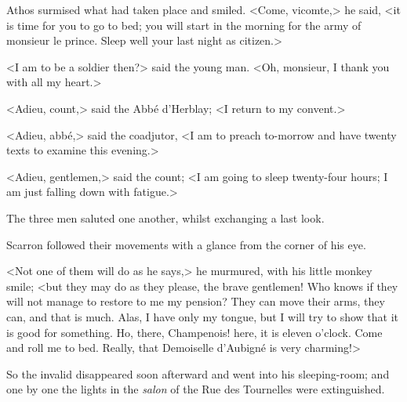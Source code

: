 Athos surmised what had taken place and smiled. <Come, vicomte,> he said, <it is time for you to go to bed; you will start in the morning for the army of monsieur le prince. Sleep well your last night as citizen.>

<I am to be a soldier then?> said the young man. <Oh, monsieur, I thank you with all my heart.>

<Adieu, count,> said the Abbé d'Herblay; <I return to my convent.>

<Adieu, abbé,> said the coadjutor, <I am to preach to-morrow and have twenty texts to examine this evening.>

<Adieu, gentlemen,> said the count; <I am going to sleep twenty-four hours; I am just falling down with fatigue.>

The three men saluted one another, whilst exchanging a last look.

Scarron followed their movements with a glance from the corner of his eye.

<Not one of them will do as he says,> he murmured, with his little monkey smile; <but they may do as they please, the brave gentlemen! Who knows if they will not manage to restore to me my pension? They can move their arms, they can, and that is much. Alas, I have only my tongue, but I will try to show that it is good for something. Ho, there, Champenois! here, it is eleven o'clock. Come and roll me to bed. Really, that Demoiselle d'Aubigné is very charming!>

So the invalid disappeared soon afterward and went into his sleeping-room; and one by one the lights in the \textit{salon} of the Rue des Tournelles were extinguished. 